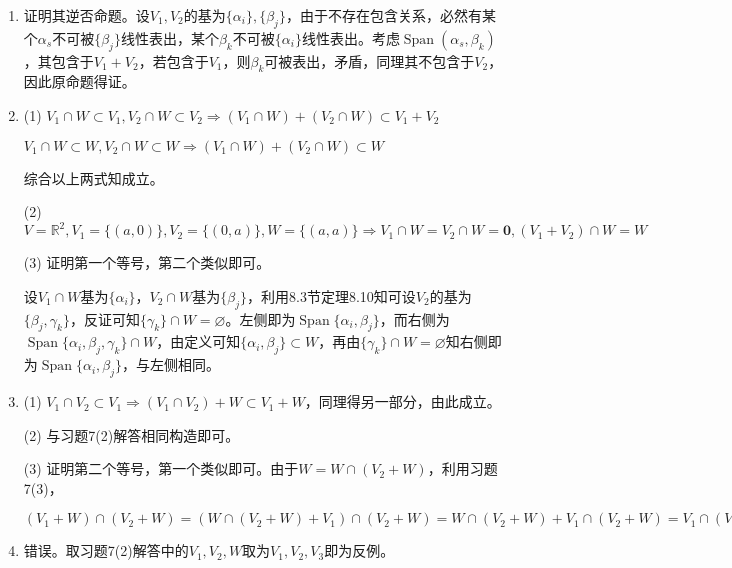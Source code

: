 \documentclass[a4paper,UTF8,fontset=windows]{ctexart}
\DeclareMathOperator{\Span}{Span}
\begin{document}
\begin{enumerate}
\item
证明其逆否命题。设$V_1,V_2$的基为$\{\alpha_i\},\{\beta_j\}$，由于不存在包含关系，必然有某个$\alpha_s$不可被$\{\beta_j\}$线性表出，某个$\beta_k$不可被$\{\alpha_i\}$线性表出。考虑$\Span(\alpha_s,\beta_k)$，其包含于$V_1+V_2$，若包含于$V_1$，则$\beta_k$可被表出，矛盾，同理其不包含于$V_2$，因此原命题得证。

\item
(1) $V_1\cap W\subset V_1,V_2\cap W\subset V_2\Rightarrow (V_1\cap W)+(V_2\cap W)\subset V_1+V_2$

$V_1\cap W\subset W,V_2\cap W\subset W\Rightarrow (V_1\cap W)+(V_2\cap W)\subset W$

综合以上两式知成立。

(2) $V=\mathbb{R}^2,V_1=\{(a,0)\},V_2=\{(0,a)\},W=\{(a,a)\}\Rightarrow V_1\cap W=V_2\cap W=\mathbf{0},(V_1+V_2)\cap W=W$

(3) 证明第一个等号，第二个类似即可。

设$V_1\cap W$基为$\{\alpha_i\}$，$V_2\cap W$基为$\{\beta_j\}$，利用8.3节定理8.10知可设$V_2$的基为$\{\beta_j,\gamma_k\}$，反证可知$\{\gamma_k\}\cap W=\varnothing$。左侧即为$\Span\{\alpha_i,\beta_j\}$，而右侧为$\Span\{\alpha_i,\beta_j,\gamma_k\}\cap W$，由定义可知$\{\alpha_i,\beta_j\}\subset W$，再由$\{\gamma_k\}\cap W=\varnothing$知右侧即为$\Span\{\alpha_i,\beta_j\}$，与左侧相同。

\item
(1) $V_1\cap V_2\subset V_1\Rightarrow (V_1\cap V_2)+ W\subset V_1+W$，同理得另一部分，由此成立。

(2) 与习题7(2)解答相同构造即可。

(3) 证明第二个等号，第一个类似即可。由于$W=W\cap(V_2+W)$，利用习题7(3)，

$(V_1+W)\cap(V_2+W)=(W\cap(V_2+W)+V_1)\cap(V_2+W)=W\cap(V_2+W)+V_1\cap(V_2+W)=V_1\cap(V_2+W)+W$

\item
错误。取习题7(2)解答中的$V_1,V_2,W$取为$V_1,V_2,V_3$即为反例。
\end{enumerate}
\end{document}
